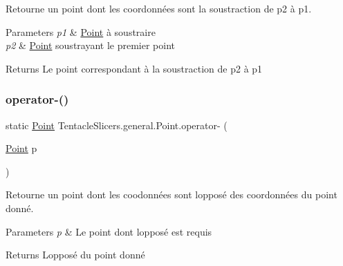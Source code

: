 Retourne un point dont les coordonnées sont la soustraction de p2 à p1. 


\begin{DoxyParams}{Parameters}
{\em p1} & \hyperlink{class_tentacle_slicers_1_1general_1_1_point}{Point} à soustraire \\
\hline
{\em p2} & \hyperlink{class_tentacle_slicers_1_1general_1_1_point}{Point} soustrayant le premier point \\
\hline
\end{DoxyParams}
\begin{DoxyReturn}{Returns}
Le point correspondant à la soustraction de p2 à p1 
\end{DoxyReturn}
\mbox{\label{class_tentacle_slicers_1_1general_1_1_point_a5b407645cb8640246167e7c5babb5077}} 
\subsubsection{\texorpdfstring{operator-\/()}{operator-()}\hspace{0.1cm}{\footnotesize\ttfamily [2/2]}}
{\footnotesize\ttfamily static \hyperlink{class_tentacle_slicers_1_1general_1_1_point}{Point} Tentacle\+Slicers.\+general.\+Point.\+operator-\/ (\begin{DoxyParamCaption}\item[{\hyperlink{class_tentacle_slicers_1_1general_1_1_point}{Point}}]{p }\end{DoxyParamCaption})\hspace{0.3cm}{\ttfamily [static]}}



Retourne un point dont les coodonnées sont l\textquotesingle{}opposé des coordonnées du point donné. 


\begin{DoxyParams}{Parameters}
{\em p} & Le point dont l\textquotesingle{}opposé est requis \\
\hline
\end{DoxyParams}
\begin{DoxyReturn}{Returns}
L\textquotesingle{}opposé du point donné 
\end{DoxyReturn}
\mbox{\label{class_tentacle_slicers_1_1general_1_1_point_afbbd8d74146828a2dceb4aa1c47752a3}} 
